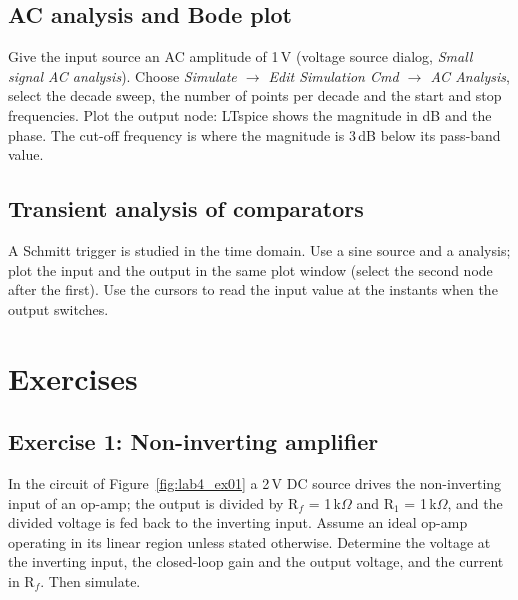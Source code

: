 
\subsection{AC analysis and Bode plot}
Give the input source an AC amplitude of 1\,V (voltage source dialog, \textit{Small signal AC analysis}). Choose \textit{Simulate $\rightarrow$ Edit Simulation Cmd $\rightarrow$ AC Analysis}, select the decade sweep, the number of points per decade and the start and stop frequencies. Plot the output node: LTspice shows the magnitude in dB and the phase. The cut-off frequency is where the magnitude is 3\,dB below its pass-band value.


\subsection{Transient analysis of comparators}
A Schmitt trigger is studied in the time domain. Use a sine source and a  analysis; plot the input and the output in the same plot window (select the second node after the first). Use the cursors to read the input value at the instants when the output switches.

\section{Exercises}

\subsection{Exercise 1: Non-inverting amplifier}
In the circuit of Figure~\ref{fig:lab4_ex01} a 2\,V DC source drives the non-inverting input of an op-amp; the output is divided by R$_f$ = 1\,k$\Omega$ and R$_1$ = 1\,k$\Omega$, and the divided voltage is fed back to the inverting input. Assume an ideal op-amp operating in its linear region unless stated otherwise. Determine the voltage at the inverting input, the closed-loop gain and the output voltage, and the current in R$_f$. Then simulate.



